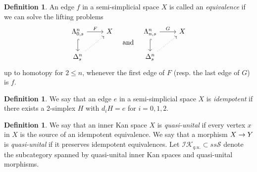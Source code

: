 \documentclass[10pt]{amsart}
\numberwithin{equation}{section}
\theoremstyle{definition}
\newtheorem{definition}[prop]{Definition}
\newcommand{\Horn}{\Lambda}
\newcommand{\cS}{\mathcal{S}}
\newcommand{\IK}{\mathcal{IK}}
\renewcommand{\to}{\mathchoice{\longrightarrow}{\rightarrow}{}{}}
\begin{document}
	\begin{definition}\label{def:eq_in_simplicial}
		An edge $f$ in a semi-simplicial space $X$ is called an \emph{equivalence} if we can solve the lifting problems
		\begin{equation*}
			\begin{tikzcd}
				\Horn^{n}_{0,s} \arrow[r, "F"] \arrow[d, hookrightarrow] & X \\
				\Delta^{n}_{s} \arrow[ur, dotted]
			\end{tikzcd}
			\quad \text{and} \quad
			\begin{tikzcd}
				\Horn^{n}_{n,s} \arrow[r, "G"] \arrow[d, hookrightarrow]& X \\
				\Delta^{n}_{s} \arrow[ur, dotted]
			\end{tikzcd}
		\end{equation*}
		up to homotopy for $2\leq n$, whenever the first edge of $F$ (resp. the last edge of $G$) is $f$.
	\end{definition}

	\begin{definition}\label{def:idempotent}
		We say that an edge $e$ in a semi-simplicial space $X$ is \emph{idempotent} if there exists a 2-simplex $H$ with $d_i H =e$ for $i=0,1,2$.
	\end{definition}
	\begin{definition}\label{def:quasi-unital}
		We say that an inner Kan space $X$ is \emph{quasi-unital} if every vertex $x$ in $X$ is the source of an idempotent equivalence. We say that a morphism $X\to Y$ is \emph{quasi-unital} if it preserves idempotent equivalences. Let $\IK_{q.u.} \subset ss\cS$ denote the subcategory spanned by quasi-unital inner Kan spaces and quasi-unital morphisms.
	\end{definition}
\end{document}
